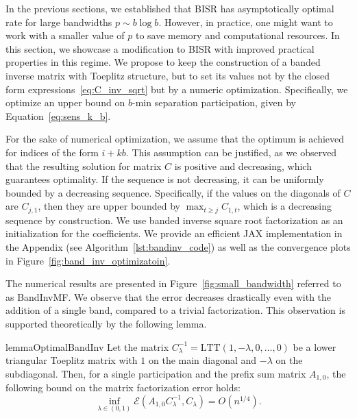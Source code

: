 \documentclass{article} %
\newcommand{\method}{banded inverse square root factorization\xspace}
\begin{document}
%
In the previous sections, we established that BISR has asymptotically optimal rate 
for large bandwidths $p \sim b \log b$.
%
However, in practice, one might want to work with a smaller value of $p$ to save memory and computational resources. 
%
In this section, we showcase a modification to BISR with improved practical properties in this regime.
%
We propose to keep the construction of a banded inverse matrix with Toeplitz 
structure, but to set its values not by the closed form expressions~\eqref{eq:C_inv_sqrt} 
but by a numeric optimization. 
%
Specifically, we optimize an upper bound on $b$-min separation participation, 
given by Equation~\ref{eq:sens_k_b}. 



For the sake of numerical optimization, we assume that the optimum is achieved for indices of the form $i + kb$. This assumption can be justified, as we observed that the resulting solution for matrix $C$ is positive and decreasing, which guarantees optimality. If the sequence is not decreasing, it can be uniformly bounded by a decreasing sequence. Specifically, if the values on the diagonals of $C$ are $C_{j,1}$, then they are upper bounded by $\max_{t \ge j} C_{1,t}$, which is a decreasing sequence by construction. We use \method as an initialization for the coefficients. We provide an efficient JAX implementation in the Appendix (see Algorithm~\ref{lst:bandinv_code}) as well as the convergence plots in Figure~\ref{fig:band_inv_optimizatoin}.

The numerical results are presented in Figure~\ref{fig:small_bandwidth} referred to as BandInvMF.  We observe that the error decreases drastically even with the addition of a single band, compared to a trivial factorization. This observation is supported theoretically by the following lemma. 

\begin{restatable}{lemma}{OptimalBandInv}
    \label{lem:optimal_band_inv} 
    Let the matrix $C_{\lambda}^{-1} = \mathrm{LTT}(1, -\lambda, 0, \dots, 0)$ be a lower triangular Toeplitz matrix with $1$ on the main diagonal and $-\lambda$ on the subdiagonal. Then, for a single participation and the prefix sum matrix $A_{1,0}$, the following bound on the matrix factorization error holds:
    \begin{equation}
        \inf_{\lambda \in (0,1)} \mathcal{E}\!\left(A_{1, 0}C^{-1}_{\lambda}, C_{\lambda}\right) 
        = O(n^{1/4}).
    \end{equation}
\end{restatable}
\end{document}
